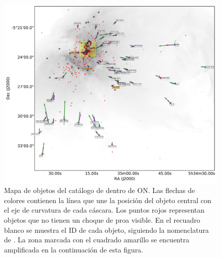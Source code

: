 \begin{figure}
  \centering
    \includegraphics[width=\linewidth]{./Figures/ll-pos-image-Luis}
  \caption[Mapa de objetos del catálogo de \citet{Gutierrez-Soto:2015a} dentro de ON]{Mapa de objetos del catálogo de \citet{Gutierrez-Soto:2015a} dentro de ON. Las flechas de colores contienen la línea que une la posición del objeto central con el eje de curvatura de cada cáscara. Los puntos rojos representan objetos que no tienen un choque de proa visible. En el recuadro blanco se muestra el ID de cada objeto, siguiendo la nomenclatura de \citet{ODell:1994a}. La zona marcada con el cuadrado amarillo se encuentra amplificada en la continuación de esta figura.}
  \label{fig:orion-map-LL}
\end{figure}

